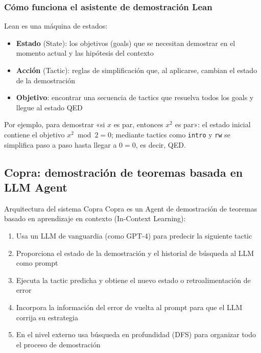 \subsubsection{Cómo funciona el asistente de demostración Lean}

Lean es una máquina de estados:
\begin{itemize}
    \item \textbf{Estado} (State): los objetivos (goals) que se necesitan demostrar en el momento actual y las hipótesis del contexto
    \item \textbf{Acción} (Tactic): reglas de simplificación que, al aplicarse, cambian el estado de la demostración
    \item \textbf{Objetivo}: encontrar una secuencia de tactics que resuelva todos los goals y llegue al estado QED
\end{itemize}

Por ejemplo, para demostrar «si $x$ es par, entonces $x^2$ es par»: el estado inicial contiene el objetivo $x^2 \bmod 2 = 0$; mediante tactics como \texttt{intro} y \texttt{rw} se simplifica paso a paso hasta llegar a $0 = 0$, es decir, QED.

\subsection{Copra: demostración de teoremas basada en LLM Agent}

\begin{importantbox}{Arquitectura del sistema Copra}
Copra es un Agent de demostración de teoremas basado en aprendizaje en contexto (In-Context Learning):
\begin{enumerate}
    \item Usa un LLM de vanguardia (como GPT-4) para predecir la siguiente tactic
    \item Proporciona el estado de la demostración y el historial de búsqueda al LLM como prompt
    \item Ejecuta la tactic predicha y obtiene el nuevo estado o retroalimentación de error
    \item Incorpora la información del error de vuelta al prompt para que el LLM corrija su estrategia
    \item En el nivel externo usa búsqueda en profundidad (DFS) para organizar todo el proceso de demostración
\end{enumerate}
\end{importantbox}

